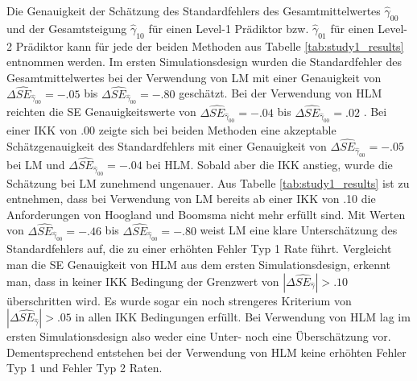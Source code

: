 \documentclass[12pt, a4paper]{article}\usepackage[]{graphicx}\usepackage[]{color}
\begin{document}
Die Genauigkeit der Schätzung des Standardfehlers des Gesamtmittelwertes $\widehat{\gamma}_{00}$ und der Gesamtsteigung $\widehat{\gamma}_{10}$ für einen Level-1 Prädiktor bzw. $\widehat{\gamma}_{01}$ für einen Level-2 Prädiktor kann für jede der beiden Methoden aus Tabelle \ref{tab:study1_results} entnommen werden. Im ersten Simulationsdesign wurden die Standardfehler des Gesamtmittelwertes bei der Verwendung von LM mit einer Genauigkeit von $\Delta\widehat{SE}_{\widehat{\gamma}_{00}} = -.05$ bis $\Delta\widehat{SE}_{\widehat{\gamma}_{00}} = -.80$ geschätzt. Bei der Verwendung von HLM reichten die SE Genauigkeitswerte von $\Delta\widehat{SE}_{\widehat{\gamma}_{00}} = -.04$ bis $\Delta\widehat{SE}_{\widehat{\gamma}_{00}} = .02$ . Bei einer IKK von .00 zeigte sich bei beiden Methoden eine akzeptable Schätzgenauigkeit des Standardfehlers mit einer Genauigkeit von $\Delta\widehat{SE}_{\widehat{\gamma}_{00}} = -.05$ bei LM und $\Delta\widehat{SE}_{\widehat{\gamma}_{00}} = -.04$ bei HLM. Sobald aber die IKK anstieg, wurde die Schätzung bei LM zunehmend ungenauer. Aus Tabelle \ref{tab:study1_results} ist zu entnehmen, dass bei Verwendung von LM bereits ab einer IKK von .10 die Anforderungen von Hoogland und Boomsma \citeyearpar{hooglandboosma1998robustness} nicht mehr erfüllt sind. Mit Werten von $\Delta\widehat{SE}_{\widehat{\gamma}_{00}} = -.46$ bis $\Delta\widehat{SE}_{\widehat{\gamma}_{00}} = -.80$ weist LM eine klare Unterschätzung des Standardfehlers auf, die zu einer erhöhten Fehler Typ 1 Rate führt. Vergleicht man die SE Genauigkeit von HLM aus dem ersten Simulationsdesign, erkennt man, dass in keiner IKK Bedingung der Grenzwert von $|\Delta\widehat{SE}_{\widehat{\gamma}}| > .10$ überschritten wird. Es wurde sogar ein noch strengeres Kriterium von $|\Delta\widehat{SE}_{\widehat{\gamma}}| > .05$ in allen IKK Bedingungen erfüllt. Bei Verwendung von HLM lag im ersten Simulationsdesign also weder eine Unter- noch eine Überschätzung vor. Dementsprechend entstehen bei der Verwendung von HLM keine erhöhten Fehler Typ 1 und Fehler Typ 2 Raten.
\end{document}

